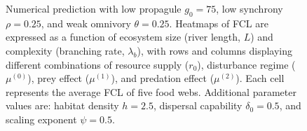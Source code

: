 \begin{figure}
\centering
{}
\caption{Numerical prediction with low propagule \(g_0 = 75\), low
synchrony \(\rho = 0.25\), and weak omnivory \(\theta = 0.25\). Heatmaps
of FCL are expressed as a function of ecosystem size (river length,
\(L\)) and complexity (branching rate, \(\lambda_b\)), with rows and
columns displaying different combinations of resource supply (\(r_0\)),
disturbance regime (\(\mu^{(0)}\)), prey effect (\(\mu^{(1)}\)), and
predation effect (\(\mu^{(2)}\)). Each cell represents the average FCL
of five food webs. Additional parameter values are: habitat density
\(h=2.5\), dispersal capability \(\delta_0=0.5\), and scaling exponent
\(\psi=0.5\).}
\end{figure}

\newpage

